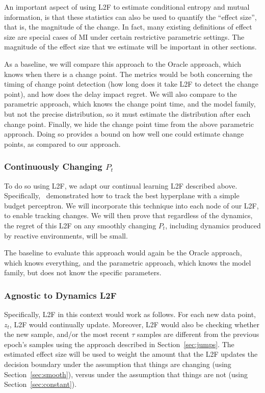 \documentclass{article}
\begin{document}
An important aspect of using L2F to estimate conditional entropy and mutual information, is that these statistics can also be used to quantify the ``effect size'', that is, the magnitude of the change.  In fact, many existing definitions of effect size are special cases of MI under certain restrictive parametric settings.  The magnitude of the effect size that we estimate will be important in other sections.


As a baseline, we will compare this approach to the Oracle approach, which knows when there is a change point.  The metrics would be both concerning the timing of change point detection (how long does it take L2F to detect the change point), and how does the delay impact regret. We will also compare to the parametric approach, which knows the change point time, and the model family, but not the precise distribution, so it must estimate the distribution after each change point. Finally, we hide the change point time from the above parametric approach. Doing so provides a bound on how well one could estimate change points, as compared to our approach. 

\subsubsection*{Continuously Changing $P_t$}

To do so using L2F, we adapt our continual learning L2F described above.  Specifically,~\citet{Cavallanti2007-sv} demonstrated how to track the best hyperplane with a simple budget perceptron.  We will incorporate this technique into each node of our L2F, to enable tracking changes. We will then prove that regardless of the dynamics, the regret of this L2F on any smoothly changing $P_t$, including dynamics produced by reactive environments, will be small.  

The baseline to evaluate this approach would again be the Oracle approach, which knows everything, and the parametric approach, which knows the model family, but does not know the specific parameters. 

\subsubsection*{Agnostic to Dynamics L2F}


Specifically, L2F in this context would work as follows.  For each new data point, $z_t$, L2F would continually update.  Moreover, L2F would also be checking whether the new sample, and/or the most recent $\tau$ samples are different from the previous epoch's samples using the approach described in Section~\ref{sec:jumps}.  The estimated effect size will be used to weight the amount that the L2F updates the decision boundary under the assumption that things are changing (using Section~\ref{sec:smooth}), versus under the assumption that things are not (using Section~\ref{sec:constant}).  
\end{document}
